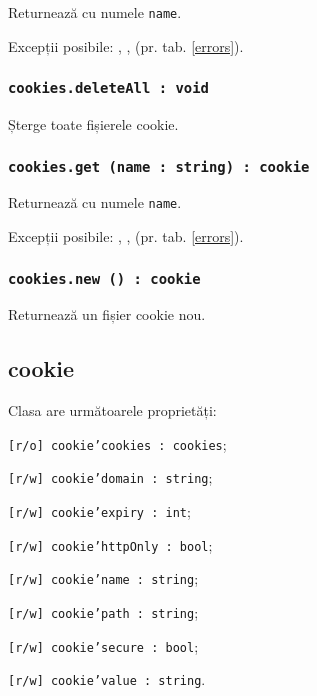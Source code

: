Returnează \cookie{} cu numele \texttt{name}.

Excepții posibile: , ,  (pr. tab. \ref{errors}).

\subsubsection{\texttt{cookies.deleteAll : void}}

Șterge toate fișierele cookie.

\subsubsection{\texttt{cookies.get (name : string) : cookie}}

Returnează \cookie{} cu numele \texttt{name}.

Excepții posibile: , ,  (pr. tab. \ref{errors}).

\subsubsection{\texttt{cookies.new () : cookie}}

Returnează un fișier cookie nou.

\subsection{cookie}

Clasa \cookie{} are următoarele proprietăți:
\begin{icItems}
	\item \texttt{[r/o] cookie'cookies : cookies};
	\item \texttt{[r/w] cookie'domain : string};
	\item \texttt{[r/w] cookie'expiry : int};
	\item \texttt{[r/w] cookie'httpOnly : bool};
	\item \texttt{[r/w] cookie'name : string};
	\item \texttt{[r/w] cookie'path : string};
	\item \texttt{[r/w] cookie'secure : bool};
	\item \texttt{[r/w] cookie'value : string}.
\end{icItems}

